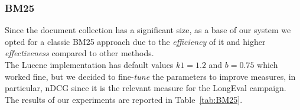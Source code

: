 \subsubsection{BM25}
\label{subsubsec:bm25}

Since the document collection has a significant size, as a base of our system we opted for a classic BM25 \citep{RobertsonZaragoza2009} approach due to the \emph{efficiency} of it and higher \emph{effectiveness} compared to other methods.  \\
The Lucene implementation has default values $k1=1.2$ and $b=0.75$ which worked fine, but we decided to fine-\emph{tune} the parameters to improve measures, in particular, \ac{nDCG} since it is the relevant measure for the LongEval campaign. The results of our experiments are reported in Table~\ref{tab:BM25}.

